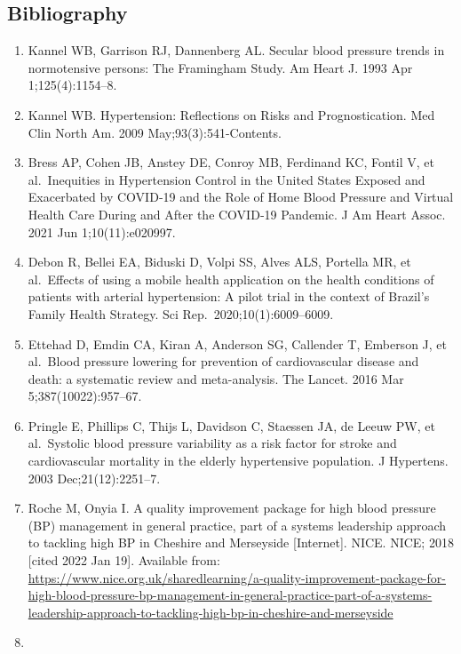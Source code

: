\documentclass[
]{article}
\providecommand{\tightlist}{%
  \setlength{\itemsep}{0pt}\setlength{\parskip}{0pt}}
\begin{document}
\hypertarget{bibliography}{%
\subsection{Bibliography}\label{bibliography}}

\begin{enumerate}
\def\labelenumi{\arabic{enumi}.}
\tightlist
\item
  Kannel WB, Garrison RJ, Dannenberg AL. Secular blood pressure trends
  in normotensive persons: The Framingham Study. Am Heart J. 1993 Apr
  1;125(4):1154--8.
\item
  Kannel WB. Hypertension: Reflections on Risks and Prognostication. Med
  Clin North Am. 2009 May;93(3):541-Contents.
\item
  Bress AP, Cohen JB, Anstey DE, Conroy MB, Ferdinand KC, Fontil V, et
  al.~Inequities in Hypertension Control in the United States Exposed
  and Exacerbated by COVID‐19 and the Role of Home Blood Pressure and
  Virtual Health Care During and After the COVID‐19 Pandemic. J Am Heart
  Assoc. 2021 Jun 1;10(11):e020997.
\item
  Debon R, Bellei EA, Biduski D, Volpi SS, Alves ALS, Portella MR, et
  al.~Effects of using a mobile health application on the health
  conditions of patients with arterial hypertension: A pilot trial in
  the context of Brazil's Family Health Strategy. Sci
  Rep.~2020;10(1):6009--6009.
\item
  Ettehad D, Emdin CA, Kiran A, Anderson SG, Callender T, Emberson J, et
  al.~Blood pressure lowering for prevention of cardiovascular disease
  and death: a systematic review and meta-analysis. The Lancet. 2016 Mar
  5;387(10022):957--67.
\item
  Pringle E, Phillips C, Thijs L, Davidson C, Staessen JA, de Leeuw PW,
  et al.~Systolic blood pressure variability as a risk factor for stroke
  and cardiovascular mortality in the elderly hypertensive population. J
  Hypertens. 2003 Dec;21(12):2251--7.
\item
  Roche M, Onyia I. A quality improvement package for high blood
  pressure (BP) management in general practice, part of a systems
  leadership approach to tackling high BP in Cheshire and Merseyside
  {[}Internet{]}. NICE. NICE; 2018 {[}cited 2022 Jan 19{]}. Available
  from:
  \url{https://www.nice.org.uk/sharedlearning/a-quality-improvement-package-for-high-blood-pressure-bp-management-in-general-practice-part-of-a-systems-leadership-approach-to-tackling-high-bp-in-cheshire-and-merseyside}
\item

\end{enumerate}
\end{document}
